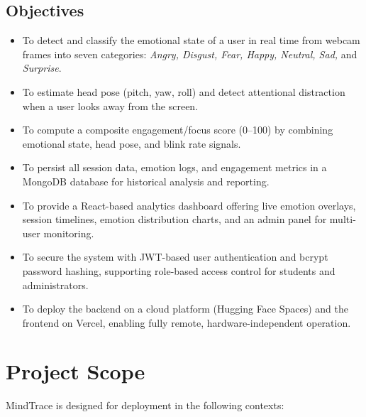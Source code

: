 \subsection{Objectives}

\begin{itemize}
    \item To detect and classify the emotional state of a user in real time from
          webcam frames into seven categories: \textit{Angry, Disgust, Fear,
          Happy, Neutral, Sad,} and \textit{Surprise}.

    \item To estimate head pose (pitch, yaw, roll) and detect attentional
          distraction when a user looks away from the screen.

    \item To compute a composite engagement/focus score (0--100) by combining
          emotional state, head pose, and blink rate signals.

    \item To persist all session data, emotion logs, and engagement metrics in a
          MongoDB database for historical analysis and reporting.

    \item To provide a React-based analytics dashboard offering live emotion
          overlays, session timelines, emotion distribution charts, and an admin
          panel for multi-user monitoring.

    \item To secure the system with JWT-based user authentication and bcrypt
          password hashing, supporting role-based access control for students
          and administrators.

    \item To deploy the backend on a cloud platform (Hugging Face Spaces) and
          the frontend on Vercel, enabling fully remote, hardware-independent
          operation.
\end{itemize}

\section{Project Scope}

MindTrace is designed for deployment in the following contexts:

